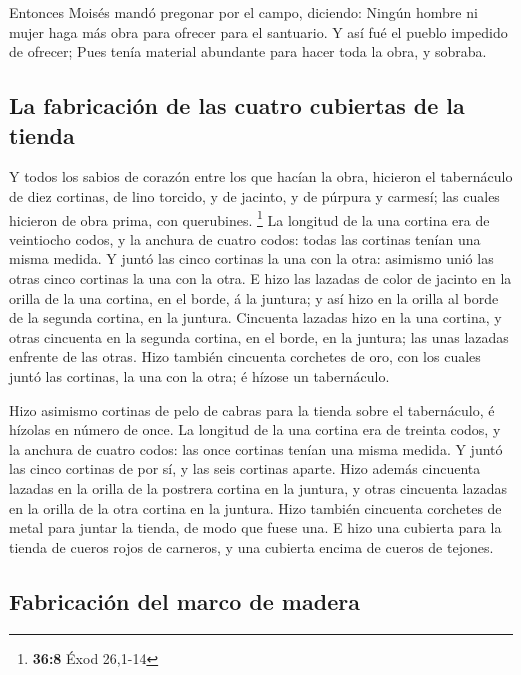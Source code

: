  Entonces Moisés mandó pregonar por el campo, diciendo:
Ningún hombre ni mujer haga más obra para ofrecer para el santuario. Y
así fué el pueblo impedido de ofrecer;  Pues tenía material
abundante para hacer toda la obra, y sobraba.

\hypertarget{la-fabricaciuxf3n-de-las-cuatro-cubiertas-de-la-tienda}{%
\subsection{La fabricación de las cuatro cubiertas de la
tienda}\label{la-fabricaciuxf3n-de-las-cuatro-cubiertas-de-la-tienda}}

 Y todos los sabios de corazón entre los que hacían la obra,
hicieron el tabernáculo de diez cortinas, de lino torcido, y de jacinto,
y de púrpura y carmesí; las cuales hicieron de obra prima, con
querubines. \footnote{\textbf{36:8} Éxod 26,1-14}  La
longitud de la una cortina era de veintiocho codos, y la anchura de
cuatro codos: todas las cortinas tenían una misma medida. 
Y juntó las cinco cortinas la una con la otra: asimismo unió las otras
cinco cortinas la una con la otra.  E hizo las lazadas de
color de jacinto en la orilla de la una cortina, en el borde, á la
juntura; y así hizo en la orilla al borde de la segunda cortina, en la
juntura.  Cincuenta lazadas hizo en la una cortina, y otras
cincuenta en la segunda cortina, en el borde, en la juntura; las unas
lazadas enfrente de las otras.  Hizo también cincuenta
corchetes de oro, con los cuales juntó las cortinas, la una con la otra;
é hízose un tabernáculo.

 Hizo asimismo cortinas de pelo de cabras para la tienda
sobre el tabernáculo, é hízolas en número de once.  La
longitud de la una cortina era de treinta codos, y la anchura de cuatro
codos: las once cortinas tenían una misma medida.  Y juntó
las cinco cortinas de por sí, y las seis cortinas aparte. 
Hizo además cincuenta lazadas en la orilla de la postrera cortina en la
juntura, y otras cincuenta lazadas en la orilla de la otra cortina en la
juntura.  Hizo también cincuenta corchetes de metal para
juntar la tienda, de modo que fuese una.  E hizo una
cubierta para la tienda de cueros rojos de carneros, y una cubierta
encima de cueros de tejones.

\hypertarget{fabricaciuxf3n-del-marco-de-madera}{%
\subsection{Fabricación del marco de
madera}\label{fabricaciuxf3n-del-marco-de-madera}}

